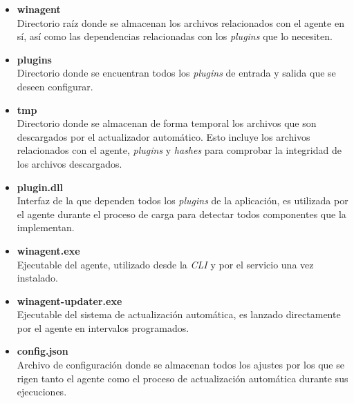             
            \begin{itemize}
                \item \textbf{winagent} \\
                    Directorio raíz donde se almacenan los archivos relacionados con el agente en sí, así como las dependencias relacionadas con los \textit{plugins} que lo necesiten.
                    
                \item \textbf{plugins} \\
                    Directorio donde se encuentran todos los \textit{plugins} de entrada y salida que se deseen configurar.
                    
                \item \textbf{tmp} \\
                    Directorio donde se almacenan de forma temporal los archivos que son descargados por el actualizador automático. Esto incluye los archivos relacionados con el agente, \textit{plugins} y \textit{hashes} para comprobar la integridad de los archivos descargados.
                    
                \item \textbf{plugin.dll} \\
                    Interfaz de la que dependen todos los \textit{plugins} de la aplicación, es utilizada por el agente durante el proceso de carga para detectar todos componentes que la implementan.
                
                \item \textbf{winagent.exe} \\
                    Ejecutable del agente, utilizado desde la \textit{CLI} y por el servicio una vez instalado.
                
                \item \textbf{winagent-updater.exe} \\
                    Ejecutable del sistema de actualización automática, es lanzado directamente por el agente en intervalos programados.
                
                \item \textbf{config.json} \\
                    Archivo de configuración donde se almacenan todos los ajustes por los que se rigen tanto el agente como el proceso de actualización automática durante sus ejecuciones.
                
            \end{itemize}
            
